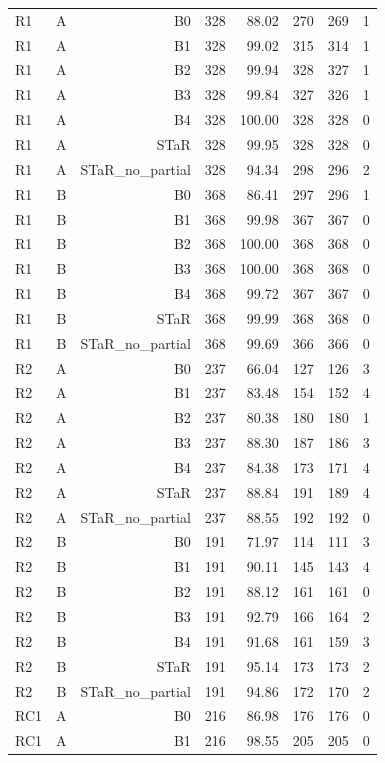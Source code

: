 \begin{longtable}{@{}lrrrrrrr@{}}
R1 & A & B0 & 328 & 88.02 & 270 & 269 & 1 \\
R1 & A & B1 & 328 & 99.02 & 315 & 314 & 1 \\
R1 & A & B2 & 328 & 99.94 & 328 & 327 & 1 \\
R1 & A & B3 & 328 & 99.84 & 327 & 326 & 1 \\
R1 & A & B4 & 328 & 100.00 & 328 & 328 & 0 \\
R1 & A & STaR & 328 & 99.95 & 328 & 328 & 0 \\
R1 & A & STaR\_no\_partial & 328 & 94.34 & 298 & 296 & 2 \\
R1 & B & B0 & 368 & 86.41 & 297 & 296 & 1 \\
R1 & B & B1 & 368 & 99.98 & 367 & 367 & 0 \\
R1 & B & B2 & 368 & 100.00 & 368 & 368 & 0 \\
R1 & B & B3 & 368 & 100.00 & 368 & 368 & 0 \\
R1 & B & B4 & 368 & 99.72 & 367 & 367 & 0 \\
R1 & B & STaR & 368 & 99.99 & 368 & 368 & 0 \\
R1 & B & STaR\_no\_partial & 368 & 99.69 & 366 & 366 & 0 \\
R2 & A & B0 & 237 & 66.04 & 127 & 126 & 3 \\
R2 & A & B1 & 237 & 83.48 & 154 & 152 & 4 \\
R2 & A & B2 & 237 & 80.38 & 180 & 180 & 1 \\
R2 & A & B3 & 237 & 88.30 & 187 & 186 & 3 \\
R2 & A & B4 & 237 & 84.38 & 173 & 171 & 4 \\
R2 & A & STaR & 237 & 88.84 & 191 & 189 & 4 \\
R2 & A & STaR\_no\_partial & 237 & 88.55 & 192 & 192 & 0 \\
R2 & B & B0 & 191 & 71.97 & 114 & 111 & 3 \\
R2 & B & B1 & 191 & 90.11 & 145 & 143 & 4 \\
R2 & B & B2 & 191 & 88.12 & 161 & 161 & 0 \\
R2 & B & B3 & 191 & 92.79 & 166 & 164 & 2 \\
R2 & B & B4 & 191 & 91.68 & 161 & 159 & 3 \\
R2 & B & STaR & 191 & 95.14 & 173 & 173 & 2 \\
R2 & B & STaR\_no\_partial & 191 & 94.86 & 172 & 170 & 2 \\
RC1 & A & B0 & 216 & 86.98 & 176 & 176 & 0 \\
RC1 & A & B1 & 216 & 98.55 & 205 & 205 & 0 \\

\end{longtable}
